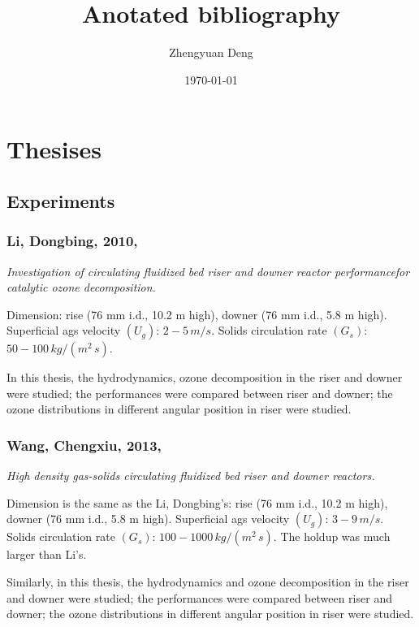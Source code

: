 \documentclass[12pt]{report}
\title{Anotated bibliography}
\author{Zhengyuan Deng}
\date{\today}
\begin{document}
\maketitle

\newpage
\tableofcontents
\chapter{Thesises}
\section{Experiments}
%
%
\subsection[Li, Dongbing, 2010]{Li, Dongbing, 2010, \cite{li2010}}
\textit{Investigation of circulating fluidized bed riser and downer reactor performancefor catalytic ozone decomposition.}

Dimension: rise (76 mm i.d., 10.2 m high), downer (76 mm i.d., 5.8 m high). Superficial ags velocity $(U_g)$: $2-5\,\si{m/s}$. 
Solids circulation rate $(G_s)$: $50-100\,\si{kg/(m^2\,s)}$.

In this thesis, the hydrodynamics, ozone decomposition in the riser and downer were studied; 
the performances were compared between riser and downer; 
the ozone distributions in different angular position in riser were studied.

%
%
\subsection[Wang, Chengxiu, 2013]{Wang, Chengxiu, 2013, \cite{wangcx2013}}
\textit{High density gas-solids circulating fluidized bed riser and downer reactors.}

Dimension is the same as the Li, Dongbing's: rise (76 mm i.d., 10.2 m high), downer (76 mm i.d., 5.8 m high). 
Superficial ags velocity $(U_g)$: $3-9\,\si{m/s}$. 
Solids circulation rate $(G_s)$: $100-1000\,\si{kg/(m^2\,s)}$. 
The holdup was much larger than Li's.

Similarly, in this thesis, the hydrodynamics and ozone decomposition in the riser and downer were studied;
the performances were compared between riser and downer; 
the ozone distributions in different angular position in riser were studied.
\end{document}
